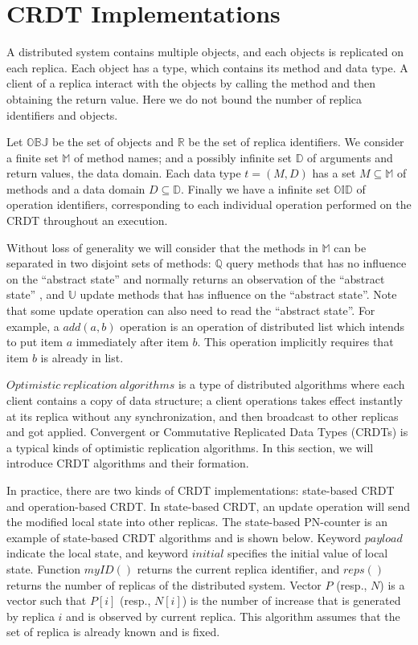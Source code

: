 
\section{CRDT Implementations}
\label{sec:CRDT implementations}

A distributed system contains multiple objects, and each objects is replicated on each replica. Each object has a type, which contains its method and data type. A client of a replica interact with the objects by calling the method and then obtaining the return value. Here we do not bound the number of replica identifiers and objects.

Let $\mathbb{OBJ}$ be the set of objects and $\mathbb{R}$ be the set of replica identifiers. We consider a finite set $\mathbb{M}$ of method names; and a possibly infinite set $\mathbb{D}$ of arguments and return values, the data domain. Each data type $t = (M,D)$ has a set $M \subseteq \mathbb{M}$ of methods and a data domain $D \subseteq \mathbb{D}$. Finally we have a infinite set $\mathbb{OID}$ of operation identifiers, corresponding to each individual operation performed on the CRDT throughout an execution.

Without loss of generality we will consider that the methods in $\mathbb{M}$ can be separated in two disjoint sets of methods: $\mathbb{Q}$ query methods that has no influence on the ``abstract state'' and normally returns an observation of the ``abstract state'' , and $\mathbb{U}$ update methods that has influence on the ``abstract state''. Note that some update operation can also need to read the ``abstract state''. For example, a $add(a,b)$ operation is an operation of distributed list which intends to put item $a$ immediately after item $b$. This operation implicitly requires that item $b$ is already in list. 

$\mathit{Optimistic \ replication \ algorithms}$ is a type of distributed algorithms where each client contains a copy of data structure; a client operations takes effect instantly at its replica without any synchronization, and then broadcast to other replicas and got applied. Convergent or Commutative Replicated Data Types (CRDTs) is a typical kinds of optimistic replication algorithms. In this section, we will introduce CRDT algorithms and their formation. 

In practice, there are two kinds of CRDT implementations: state-based CRDT and operation-based CRDT. In state-based CRDT, an update operation will send the modified local state into other replicas. The state-based PN-counter is an example of state-based CRDT algorithms and is shown below. Keyword $\mathit{payload}$ indicate the local state, and keyword $\mathit{initial}$ specifies the initial value of local state. Function $\mathit{myID}()$ returns the current replica identifier, and $\mathit{reps}()$ returns the number of replicas of the distributed system. Vector $P$ (resp., $N$) is a vector such that $P[i]$ (resp., $N[i]$) is the number of increase that is generated by replica $i$ and is observed by current replica. This algorithm assumes that the set of replica is already known and is fixed. 

